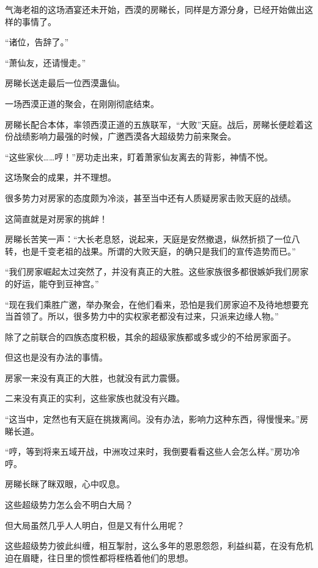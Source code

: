 \begin{this_body}
气海老祖的这场酒宴还未开始，西漠的房睇长，同样是方源分身，已经开始做出这样的事情了。

“诸位，告辞了。”

“萧仙友，还请慢走。”

房睇长送走最后一位西漠蛊仙。

一场西漠正道的聚会，在刚刚彻底结束。

房睇长配合本体，率领西漠正道的五族联军，“大败”天庭。战后，房睇长便趁着这份战绩影响力最强的时候，广邀西漠各大超级势力前来聚会。

“这些家伙……哼！”房功走出来，盯着萧家仙友离去的背影，神情不悦。

这场聚会的成果，并不理想。

很多势力对房家的态度颇为冷淡，甚至当中还有人质疑房家击败天庭的战绩。

这简直就是对房家的挑衅！

房睇长苦笑一声：“大长老息怒，说起来，天庭是安然撤退，纵然折损了一位八转，也是千变老祖的战果。所谓的大败天庭，的确只是我们的宣传造势而已。”

“我们房家崛起太过突然了，并没有真正的大胜。这些家族很多都很嫉妒我们房家的好运，能夺到豆神宫。”

“现在我们乘胜广邀，举办聚会，在他们看来，恐怕是我们房家迫不及待地想要充当首领了。所以，很多势力中的实权家老都没有过来，只派来边缘人物。”

除了之前联合的四族态度积极，其余的超级家族都或多或少的不给房家面子。

但这也是没有办法的事情。

房家一来没有真正的大胜，也就没有武力震慑。

二来没有真正的实利，这些家族也就没有兴趣。

“这当中，定然也有天庭在挑拨离间。没有办法，影响力这种东西，得慢慢来。”房睇长道。

“哼，等到将来五域开战，中洲攻过来时，我倒要看看这些人会怎么样。”房功冷哼。

房睇长眯了眯双眼，心中叹息。

这些超级势力怎么会不明白大局？

但大局虽然几乎人人明白，但是又有什么用呢？

这些超级势力彼此纠缠，相互掣肘，这么多年的恩恩怨怨，利益纠葛，在没有危机迫在眉睫，往日里的惯性都将桎梏着他们的思想。

\end{this_body}

